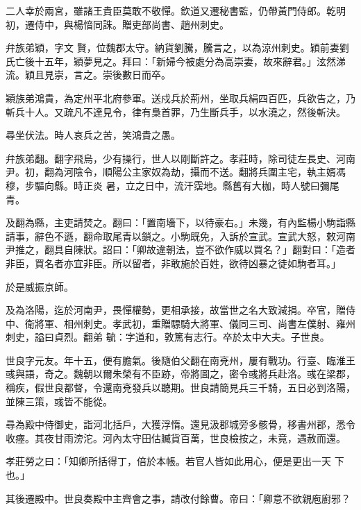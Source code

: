 \begin{pinyinscope}
 二人幸於兩宮，雖諸王貴臣莫敢不敬憚。欽道又遷秘書監，仍帶黃門侍郎。乾明初，遷侍中，與楊愔同誅。贈吏部尚書、趙州刺史。



 弁族弟穎，字文
 賢，位魏郡太守。納貨劉騰，騰言之，以為涼州刺史。穎前妻劉氏亡後十五年，穎夢見之。拜曰：「新婦今被處分為高崇妻，故來辭君。」泫然涕流。穎且見崇，言之。崇後數日而卒。



 穎族弟鴻貴，為定州平北府參軍。送戍兵於荊州，坐取兵絹四百匹，兵欲告之，乃斬兵十人。又疏凡不達見令，律有梟首罪，乃生斷兵手，以水澆之，然後斬決。



 尋坐伏法。時人哀兵之苦，笑鴻貴之愚。



 弁族弟翻。翻字飛烏，少有操行，世人以剛斷許之。孝莊時，除司徒左長史、河南尹。初，翻為河陰令，順陽公主家奴為劫，攝而不送。翻將兵圍主宅，執主婿馮穆，步驅向縣。時正炎
 暑，立之日中，流汗霑地。縣舊有大枷，時人號曰彌尾青。



 及翻為縣，主吏請焚之。翻曰：「置南墻下，以待豪右。」未幾，有內監楊小駒詣縣請事，辭色不遜，翻命取尾青以鎖之。小駒既免，入訴於宣武。宣武大怒，敕河南尹推之，翻具自陳狀。詔曰：「卿故違朝法，豈不欲作威以買名？」翻對曰：「造者非臣，買名者亦宜非臣。所以留者，非敢施於百姓，欲待凶暴之徒如駒者耳。」



 於是威振京師。



 及為洛陽，迄於河南尹，畏憚權勢，更相承接，故當世之名大致減捐。卒官，贈侍中、衛將軍、相州刺史。孝武初，重贈驃騎大將軍、儀同三司、尚書左僕射、雍州刺史，謚曰貞烈。翻弟
 毓：字道和，敦篤有志行。卒於太中大夫。子世良。



 世良字元友。年十五，便有膽氣。後隨伯父翻在南兗州，屢有戰功。行臺、臨淮王彧與語，奇之。魏朝以爾朱榮有不臣跡，帝將圖之，密令彧將兵赴洛。彧在梁郡，稱疾，假世良都督，令還南兗發兵以聽期。世良請簡見兵三千騎，五日必到洛陽，並陳三策，彧皆不能從。



 尋為殿中侍御史，詣河北括戶，大獲浮惰。還見汲郡城旁多骸骨，移書州郡，悉令收瘞。其夜甘雨滂沱。河內太守田估贓貨百萬，世良檢按之，未竟，遇赦而還。



 孝莊勞之曰：「知卿所括得丁，倍於本帳。若官人皆如此用心，便是更出一天
 下也。」



 其後遷殿中。世良奏殿中主齊會之事，請改付餘曹。帝曰：「卿意不欲親庖廚邪？




\end{pinyinscope}
